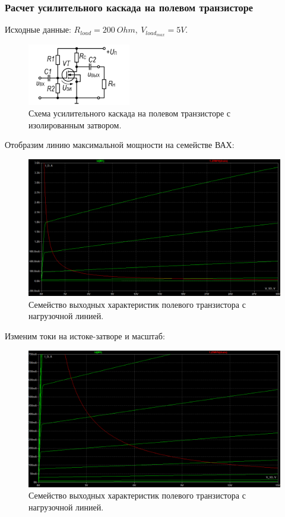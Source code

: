 \documentclass[12pt]{article}
\begin{document}
\subsubsection*{Расчет усилительного каскада на полевом транзисторе}

Исходные данные: $R_{load} = 200 \ Ohm, \ V_{load_{max}} = 5 V$.

\begin{figure}[H]
    \centering
    \includegraphics[width=0.4\textwidth]{3_book_scheme.png}
    \caption{Схема усилительного каскада на полевом транзисторе с изолированным затвором.}
    \label{fig:3_book_scheme}
\end{figure}

Отобразим линию максимальной мощности на семействе ВАХ:
\begin{figure}[H]
    \centering
    \includegraphics[width=\textwidth]{2_output_char_w_load_line.png}
    \caption{Семейство выходных характеристик полевого транзистора с нагрузочной линией.}
    \label{fig:2_output_char_w_load_line}
\end{figure}

Изменим токи на истоке-затворе и масштаб:
\begin{figure}[H]
    \centering
    \includegraphics[width=\textwidth]{2_output_with_max_power_line_small.png}
    \caption{Семейство выходных характеристик полевого транзистора с нагрузочной линией.}
    \label{fig:2_output_with_max_power_line_small}
\end{figure}
\end{document}

